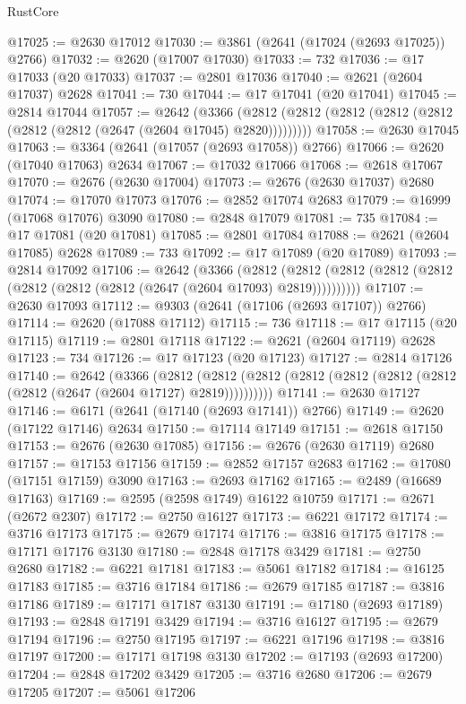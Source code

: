 \begin{lexlean}{RustCore}
\begin{coremodule}
@17025 := @2630 @17012
@17030 := @3861 (@2641 (@17024 (@2693 @17025)) @2766)
@17032 := @2620 (@17007 @17030)
@17033 := 732
@17036 := @17 @17033 (@20 @17033)
@17037 := @2801 @17036
@17040 := @2621 (@2604 @17037) @2628
@17041 := 730
@17044 := @17 @17041 (@20 @17041)
@17045 := @2814 @17044
@17057 := @2642
    (@3366 (@2812 (@2812 (@2812 (@2812 (@2812 (@2812 (@2812 (@2647 (@2604 @17045) @2820)))))))))
@17058 := @2630 @17045
@17063 := @3364 (@2641 (@17057 (@2693 @17058)) @2766)
@17066 := @2620 (@17040 @17063) @2634
@17067 := @17032 @17066
@17068 := @2618 @17067
@17070 := @2676 (@2630 @17004)
@17073 := @2676 (@2630 @17037) @2680
@17074 := @17070 @17073
@17076 := @2852 @17074 @2683
@17079 := @16999 (@17068 @17076) @3090
@17080 := @2848 @17079
@17081 := 735
@17084 := @17 @17081 (@20 @17081)
@17085 := @2801 @17084
@17088 := @2621 (@2604 @17085) @2628
@17089 := 733
@17092 := @17 @17089 (@20 @17089)
@17093 := @2814 @17092
@17106 := @2642
    (@3366
      (@2812 (@2812 (@2812 (@2812 (@2812 (@2812 (@2812 (@2812 (@2647 (@2604 @17093) @2819))))))))))
@17107 := @2630 @17093
@17112 := @9303 (@2641 (@17106 (@2693 @17107)) @2766)
@17114 := @2620 (@17088 @17112)
@17115 := 736
@17118 := @17 @17115 (@20 @17115)
@17119 := @2801 @17118
@17122 := @2621 (@2604 @17119) @2628
@17123 := 734
@17126 := @17 @17123 (@20 @17123)
@17127 := @2814 @17126
@17140 := @2642
    (@3366
      (@2812 (@2812 (@2812 (@2812 (@2812 (@2812 (@2812 (@2812 (@2647 (@2604 @17127) @2819))))))))))
@17141 := @2630 @17127
@17146 := @6171 (@2641 (@17140 (@2693 @17141)) @2766)
@17149 := @2620 (@17122 @17146) @2634
@17150 := @17114 @17149
@17151 := @2618 @17150
@17153 := @2676 (@2630 @17085)
@17156 := @2676 (@2630 @17119) @2680
@17157 := @17153 @17156
@17159 := @2852 @17157 @2683
@17162 := @17080 (@17151 @17159) @3090
@17163 := @2693 @17162
@17165 := @2489 (@16689 @17163)
@17169 := @2595 (@2598 @1749) @16122 @10759
@17171 := @2671 (@2672 @2307)
@17172 := @2750 @16127
@17173 := @6221 @17172
@17174 := @3716 @17173
@17175 := @2679 @17174
@17176 := @3816 @17175
@17178 := @17171 @17176 @3130
@17180 := @2848 @17178 @3429
@17181 := @2750 @2680
@17182 := @6221 @17181
@17183 := @5061 @17182
@17184 := @16125 @17183
@17185 := @3716 @17184
@17186 := @2679 @17185
@17187 := @3816 @17186
@17189 := @17171 @17187 @3130
@17191 := @17180 (@2693 @17189)
@17193 := @2848 @17191 @3429
@17194 := @3716 @16127
@17195 := @2679 @17194
@17196 := @2750 @17195
@17197 := @6221 @17196
@17198 := @3816 @17197
@17200 := @17171 @17198 @3130
@17202 := @17193 (@2693 @17200)
@17204 := @2848 @17202 @3429
@17205 := @3716 @2680
@17206 := @2679 @17205
@17207 := @5061 @17206

\end{coremodule}
\end{lexlean}
